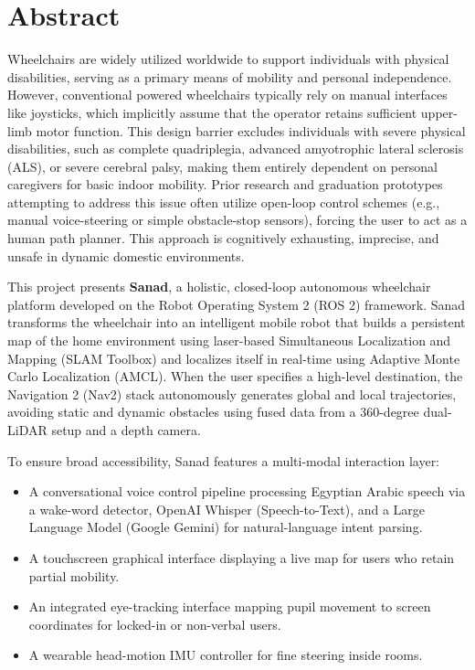 \chapter*{Abstract}

Wheelchairs are widely utilized worldwide to support individuals with physical disabilities, serving as a primary means of mobility and personal independence. However, conventional powered wheelchairs typically rely on manual interfaces like joysticks, which implicitly assume that the operator retains sufficient upper-limb motor function. This design barrier excludes individuals with severe physical disabilities, such as complete quadriplegia, advanced amyotrophic lateral sclerosis (ALS), or severe cerebral palsy, making them entirely dependent on personal caregivers for basic indoor mobility. Prior research and graduation prototypes attempting to address this issue often utilize open-loop control schemes (e.g., manual voice-steering or simple obstacle-stop sensors), forcing the user to act as a human path planner. This approach is cognitively exhausting, imprecise, and unsafe in dynamic domestic environments.

This project presents \textbf{Sanad}, a holistic, closed-loop autonomous wheelchair platform developed on the Robot Operating System 2 (ROS 2) framework. Sanad transforms the wheelchair into an intelligent mobile robot that builds a persistent map of the home environment using laser-based Simultaneous Localization and Mapping (SLAM Toolbox) and localizes itself in real-time using Adaptive Monte Carlo Localization (AMCL). When the user specifies a high-level destination, the Navigation 2 (Nav2) stack autonomously generates global and local trajectories, avoiding static and dynamic obstacles using fused data from a 360-degree dual-LiDAR setup and a depth camera.

To ensure broad accessibility, Sanad features a multi-modal interaction layer:
\begin{itemize}[itemsep=0pt, parsep=0pt, topsep=0pt]
    \item A conversational voice control pipeline processing Egyptian Arabic speech via a wake-word detector, OpenAI Whisper (Speech-to-Text), and a Large Language Model (Google Gemini) for natural-language intent parsing.
    \item A touchscreen graphical interface displaying a live map for users who retain partial mobility.
    \item An integrated eye-tracking interface mapping pupil movement to screen coordinates for locked-in or non-verbal users.
    \item A wearable head-motion IMU controller for fine steering inside rooms.
\end{itemize}

